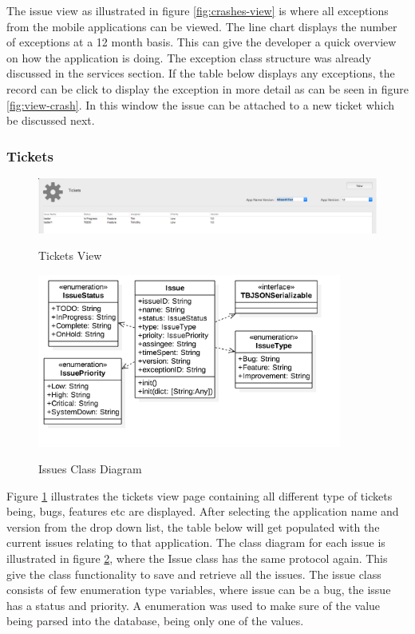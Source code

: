 The issue view as illustrated in figure \ref{fig:crashes-view} is where all exceptions from the mobile applications can be viewed. The line chart displays the number of exceptions at a 12 month basis. This can give the developer a quick overview on how the application is doing. The exception class structure was already discussed in the services section. If the table below displays any exceptions, the record can be click to display the exception in more detail as can be seen in figure \ref{fig:view-crash}. In this window the issue can be attached to a new ticket which be discussed next.

\subsubsection{Tickets}

\begin{figure}[!h]
    \caption{Tickets View}
    \centering
    \includegraphics[width=150mm]{images/dashboard/tickets}
    \label{fig:issues-view}
\end{figure} 


\begin{figure}[!h]
    \caption{Issues Class Diagram}
    \centering
    \includegraphics[width=100mm]{images/classdiagrams/Issues}
    \label{fig:issues-cd}
\end{figure} 

Figure \ref{fig:issues-view} illustrates the tickets view page containing all different type of tickets being, bugs, features etc are displayed. After selecting the application name and version from the drop down list, the table below will get populated with the current issues relating to that application. The class diagram for each issue is illustrated in figure \ref{fig:issues-cd}, where the Issue class has the same protocol again. This give the class functionality to save and retrieve all the issues. The issue class consists of few enumeration type variables, where issue can be a bug, the issue has a status and priority. A enumeration was used to make sure of the value being parsed into the database, being only one of the values.

